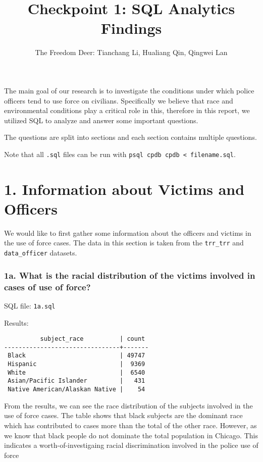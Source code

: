 \documentclass[10pt]{article}
\title{Checkpoint 1: SQL Analytics Findings}
\author{The Freedom Deer: Tianchang Li, Hualiang Qin, Qingwei Lan}
\begin{document}
\maketitle

The main goal of our research is to investigate the conditions under which police officers tend to use force on civilians. Specifically we believe that race and environmental conditions play a critical role in this, therefore in this report, we utilized SQL to analyze and answer some important questions.

The questions are split into sections and each section contains multiple questions.

Note that all \texttt{.sql} files can be run with \texttt{psql cpdb cpdb < filename.sql}.

\section*{1. Information about Victims and Officers}

We would like to first gather some information about the officers and victims in the use of force cases. The data in this section is taken from the \texttt{trr\_trr} and \texttt{data\_officer} datasets.

\subsubsection*{1a. What is the racial distribution of the victims involved in cases of use of force?}

SQL file: \texttt{1a.sql}

Results:

\begin{verbatim}
          subject_race          | count
--------------------------------+-------
 Black                          | 49747
 Hispanic                       |  9369
 White                          |  6540
 Asian/Pacific Islander         |   431
 Native American/Alaskan Native |    54
\end{verbatim}

From the results, we can see the race distribution of the subjects involved in the use of force cases. The table shows that black subjects are the dominant race which has contributed to cases more than the total of the other race. However, as we know that black people do not dominate the total population in Chicago. This indicates a worth-of-investigaing racial discrimination involved in the police use of force
\end{document}
